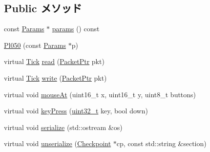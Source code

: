 \subsection*{Public メソッド}
\begin{DoxyCompactItemize}
\item 
const \hyperlink{classPl050_a12cd0d18c639c998ce04efabfca4d619}{Params} $\ast$ \hyperlink{classPl050_acd3c3feb78ae7a8f88fe0f110a718dff}{params} () const 
\item 
\hyperlink{classPl050_aee46f95854b38b40deb83122bffdde55}{Pl050} (const \hyperlink{classPl050_a12cd0d18c639c998ce04efabfca4d619}{Params} $\ast$p)
\item 
virtual \hyperlink{base_2types_8hh_a5c8ed81b7d238c9083e1037ba6d61643}{Tick} \hyperlink{classPl050_a613ec7d5e1ec64f8d21fec78ae8e568e}{read} (\hyperlink{classPacket}{PacketPtr} pkt)
\item 
virtual \hyperlink{base_2types_8hh_a5c8ed81b7d238c9083e1037ba6d61643}{Tick} \hyperlink{classPl050_a4cefab464e72b5dd42c003a0a4341802}{write} (\hyperlink{classPacket}{PacketPtr} pkt)
\item 
virtual void \hyperlink{classPl050_adfccd86af30aeaf063a1700dedde4788}{mouseAt} (uint16\_\-t x, uint16\_\-t y, uint8\_\-t buttons)
\item 
virtual void \hyperlink{classPl050_a24207a2cfb1351040a29bc3a1e341e42}{keyPress} (\hyperlink{Type_8hh_a435d1572bf3f880d55459d9805097f62}{uint32\_\-t} key, bool down)
\item 
virtual void \hyperlink{classPl050_a53e036786d17361be4c7320d39c99b84}{serialize} (std::ostream \&os)
\item 
virtual void \hyperlink{classPl050_af22e5d6d660b97db37003ac61ac4ee49}{unserialize} (\hyperlink{classCheckpoint}{Checkpoint} $\ast$cp, const std::string \&section)
\end{DoxyCompactItemize}
